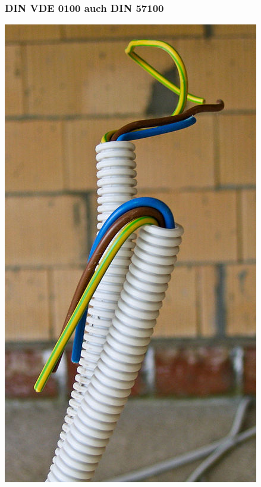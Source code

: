 \begin{frame}
  \frametitle{DIN VDE 0100 auch DIN 57100}
  \begin{center}
    \includegraphics[width=\textwidth,height=0.8\textheight,keepaspectratio]{a19/ElectricWireGrounded.jpg}\\
    {\tiny \hyperlink{refs}{\cite{wm}}}
  \end{center}
\end{frame}


